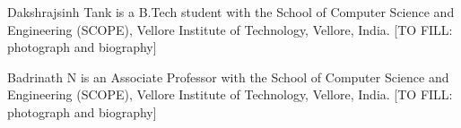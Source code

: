\documentclass[journal]{IEEEtran}
\begin{document}
\begin{IEEEbiographynophoto}{Dakshrajsinh Tank}
is a B.Tech student with the School of Computer Science and Engineering (SCOPE), Vellore
Institute of Technology, Vellore, India. [TO FILL: photograph and biography]
\end{IEEEbiographynophoto}

\begin{IEEEbiographynophoto}{Badrinath N}
is an Associate Professor with the School of Computer Science and Engineering (SCOPE), Vellore
Institute of Technology, Vellore, India. [TO FILL: photograph and biography]
\end{IEEEbiographynophoto}
\end{document}
